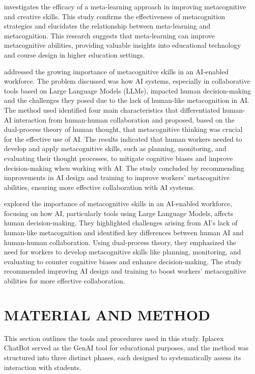 \documentclass[sn-apa]{sn-jnl} %
\begin{document}
\cite{Khusnul24} investigates
the efficacy of a meta-learning approach in improving metacognitive and creative
skills. This study confirms the effectiveness of metacognition strategies and
elucidates the relationship between meta-learning and metacognition. This
research suggests that meta-learning can improve metacognitive abilities,
providing valuable insights into educational technology and course design in
higher education settings.

\cite{Sidra24} addressed the growing importance of metacognitive skills in an
AI-enabled workforce. The problem discussed was how AI systems, especially in
collaborative tools based on Large Language Models (LLMs), impacted human
decision-making and the challenges they posed due to the lack of human-like
metacognition in AI. The method used identified four main characteristics that
differentiated human-AI interaction from human-human collaboration and proposed,
based on the dual-process theory of human thought, that metacognitive thinking
was crucial for the effective use of AI. The results indicated that human
workers needed to develop and apply metacognitive skills, such as planning,
monitoring, and evaluating their thought processes, to mitigate cognitive biases
and improve decision-making when working with AI. The study concluded by
recommending improvements in AI design and training to improve workers'
metacognitive abilities, ensuring more effective collaboration with AI systems.

\cite{Sidra24} explored the importance of metacognitive skills in an AI-enabled
workforce, focusing on how AI, particularly tools using Large Language Models,
affects human decision-making. They highlighted challenges arising from AI's
lack of human-like metacognition and identified key differences between human
AI and human-human collaboration. Using dual-process theory, they emphasized the
need for workers to develop metacognitive skills like planning, monitoring, and
evaluating to counter cognitive biases and enhance decision-making. The study
recommended improving AI design and training to boost workers' metacognitive
abilities for more effective collaboration.

\section{\uppercase{Material and Method}}

This section outlines the tools and procedures used in this study. Iplacex
ChatBot served as the GenAI tool for educational purposes, and the method was
structured into three distinct phases, each designed to systematically assess
its interaction with students.
\end{document}
